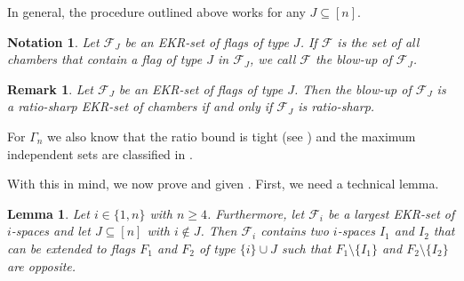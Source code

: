 \documentclass[11pt]{article}
\newtheorem{lemma}[thm]{Lemma}
\newtheorem{notation}[thm]{Notation}
\newtheorem{remark}[thm]{Remark}
\newcommand{\EKR}{\mathcal{F}}
\newcommand{\philipp}[1]{\textcolor{blue}{#1}}
\renewcommand{\geq}{\geqslant}
\begin{document}
In general, the procedure outlined above works for any $J \subseteq [n]$.

\begin{notation}
    Let $\EKR_J$ be an EKR-set of flags of type $J$. If $\EKR$ is the set of all chambers that contain a flag of type $J$ in $\EKR_J$, we call $\EKR$ the \emph{blow-up} of $\EKR_J$.
\end{notation}

\begin{remark} \label{R: blow-up}
Let $\EKR_J$ be an EKR-set of flags of type $J$. Then the blow-up of $\EKR_J$ is a ratio-sharp EKR-set of chambers if and only if $\EKR_J$ is ratio-sharp.
\end{remark}

For $\Gamma_n$ we also know that the ratio bound is tight (see \cite{stanton_ekr_chevalleygroups}) and the maximum independent sets are classified in \cite{EKR_polarspace_generators}. 



With this in mind, we now prove  and  given . First, we need a technical lemma.






\begin{lemma}
Let $i\in \{1,n\}$ with $n\geq 4$. Furthermore, let $\EKR_i$ be a largest EKR-set of $i$-spaces and let $J\subseteq [n]$ with 
$i\notin J$. Then $\EKR_i$ contains two $i$-spaces $I_1$ and $I_2$ that can be extended to flags $F_1$ and $F_2$ of type $\{i\}\cup J$ such that $F_1\setminus\{I_1\}$ and $F_2\setminus \{I_2\}$ are opposite.
\end{lemma}
\end{document}
